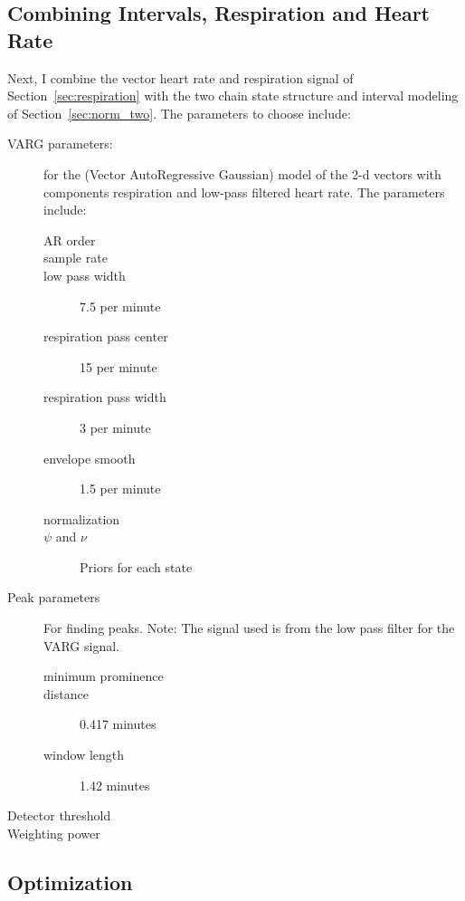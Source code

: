\documentclass[12pt]{article}
\begin{document}
\subsection{Combining Intervals, Respiration and Heart Rate}
\label{sec:combination}

Next, I combine the vector heart rate and respiration signal of
Section~\ref{sec:respiration} with the two chain state structure and
interval modeling of Section~\ref{sec:norm_two}.  The parameters to
choose include:
\begin{description}
\item[VARG parameters:] for the (Vector AutoRegressive Gaussian) model
  of the 2-d vectors with components respiration and low-pass filtered
  heart rate.  The parameters include:
  \begin{description}
  \item[AR order] %
  \item[sample rate] %
  \item[low pass width] 7.5 per minute %
  \item[respiration pass center] 15 per minute %
  \item[respiration pass width] 3 per minute %
  \item[envelope smooth] 1.5 per minute %
  \item[normalization] 
  \item[$\psi$ and $\nu$] Priors for each state
  \end{description}
\item[Peak parameters] For finding peaks.  Note: The signal used is
  from the low pass filter for the VARG signal.
  \begin{description}
  \item[minimum prominence] 
  \item[distance] 0.417 minutes
  \item[window length] 1.42 minutes
  \end{description}
\item[Detector threshold] 
\item[Weighting power] 
\end{description}

\subsection{Optimization}
\label{sec:optimization}
\end{document}
